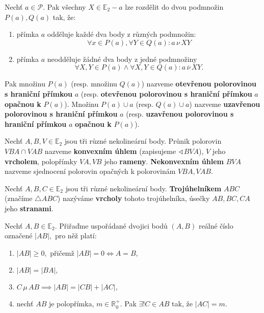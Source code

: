 \begin{definition}
  Nechť $a \in \mathscr P$. Pak všechny $X\in \mathbb E_2 - a$ lze rozdělit do dvou podmnožin $P(a), Q(a)$ tak, že:
  \begin{enumerate}[$i.$]
    \item přímka $a$ odděluje každé dva body z různých podmnožin:
      \[
        \forall x \in P(a), \forall Y \in Q(a): a \, \nu \, XY
      \]
    \item přímka $a$ neodděluje žádné dva body z jedné podmnožiny
      \[
        \forall X, Y \in P(a) \land \forall X,Y \in Q(a): a \,\overline \nu\, XY.
      \]
  \end{enumerate}
  Pak množinu $P(a)$ (resp. množinu $Q(a)$) nazveme \textbf{otevřenou polorovinou s hraniční přímkou} $a$ (resp. \textbf{otevřenou polorovinou s hraniční přímkou} $a$ \textbf{opačnou k} $P(a)$). Množinu $P(a)\cup a$ (resp. $Q(a) \cup a$) nazveme \textbf{uzavřenou polorovinou s hraniční přímkou} $a$ (resp. \textbf{uzavřenou polorovinou s hraniční přímkou} $a$ \textbf{opačnou k} $P(a)$).
\end{definition}

\begin{definition}
  Nechť $A,B,V \in \mathbb E_2$ jsou tři různé nekolineární body. Průnik polorovin $VBA \cap VAB$ nazveme \textbf{konvexním úhlem} (zapisujeme $\sphericalangle BVA$), $V$ jeho \textbf{vrcholem}, polopřímky $VA, VB$ jeho \textbf{rameny}. \textbf{Nekonvexním úhlem} $BVA$ nazveme sjednocení polorovin opačných k polorovinám $VBA,VAB.$
\end{definition}

\begin{definition}
  Nechť $A,B,C\in \mathbb E_2$ jsou tři různé nekolineární body. \textbf{Trojúhelníkem} $ABC$ (značíme $\triangle ABC$) nazýváme \textbf{vrcholy} tohoto trojúhelníka, úsečky $AB, BC, CA$ jeho \textbf{stranami}.
\end{definition}

\begin{definition}
  Nechť $A,B\in \mathbb E_2.$ Přiřaďme uspořádané dvojici bodů $(A,B)$ reálné číslo označené $|AB|,$ pro něž platí:
  \begin{enumerate}[$i.$]
    \item $|AB|\geq 0,$ přičemž $|AB|=0 \iff A=B,$
    \item $|AB|=|BA|,$
    \item $C\, \mu \, AB \implies |AB|=|CB|+|AC|,$
    \item nechť $AB$ je polopřímka, $m\in \mathbb R^+_0.$ Pak $\exists ! C\in AB$ tak, že $|AC|=m.$
  \end{enumerate}
\end{definition}

